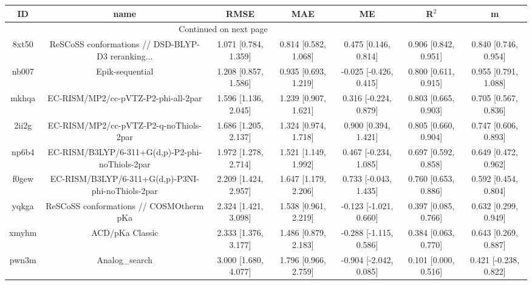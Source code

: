 \documentclass{article}
\begin{document}
\begin{center}
\begin{longtable}{|ccccccc|}
\toprule
    ID &                                               name &                  RMSE &                   MAE &                       ME &                 R$^2$ &                       m \\
\midrule
\endhead
\midrule
\multicolumn{3}{r}{{Continued on next page}} \\
\midrule
\endfoot

\bottomrule
\endlastfoot
 8xt50 &  ReSCoSS conformations // DSD-BLYP-D3 reranking... &  1.071 [0.784, 1.359] &  0.814 [0.582, 1.068] &     0.475 [0.146, 0.814] &  0.906 [0.842, 0.951] &    0.840 [0.746, 0.954] \\
 nb007 &                                    Epik-sequential &  1.208 [0.857, 1.586] &  0.935 [0.693, 1.219] &   -0.025 [-0.426, 0.415] &  0.800 [0.611, 0.915] &    0.955 [0.791, 1.088] \\
 mkhqa &                EC-RISM/MP2/cc-pVTZ-P2-phi-all-2par &  1.596 [1.136, 2.045] &  1.239 [0.907, 1.621] &    0.316 [-0.224, 0.879] &  0.803 [0.665, 0.903] &    0.705 [0.567, 0.836] \\
 2ii2g &             EC-RISM/MP2/cc-pVTZ-P2-q-noThiols-2par &  1.686 [1.205, 2.137] &  1.324 [0.974, 1.718] &     0.900 [0.394, 1.421] &  0.805 [0.660, 0.904] &    0.747 [0.606, 0.893] \\
 np6b4 &    EC-RISM/B3LYP/6-311+G(d,p)-P2-phi-noThiols-2par &  1.972 [1.278, 2.714] &  1.521 [1.149, 1.992] &    0.467 [-0.234, 1.085] &  0.697 [0.592, 0.858] &    0.649 [0.472, 0.962] \\
 f0gew &  EC-RISM/B3LYP/6-311+G(d,p)-P3NI-phi-noThiols-2par &  2.209 [1.424, 2.957] &  1.647 [1.179, 2.206] &    0.733 [-0.043, 1.435] &  0.760 [0.653, 0.886] &    0.592 [0.454, 0.804] \\
 yqkga &            ReSCoSS conformations // COSMOtherm pKa &  2.324 [1.421, 3.098] &  1.538 [0.961, 2.219] &   -0.123 [-1.021, 0.660] &  0.397 [0.085, 0.766] &    0.632 [0.299, 0.949] \\
 xmyhm &                                    ACD/pKa Classic &  2.333 [1.376, 3.177] &  1.486 [0.879, 2.183] &   -0.288 [-1.115, 0.586] &  0.384 [0.063, 0.770] &    0.643 [0.269, 0.887] \\
 pwn3m &                                     Analog\_search &  3.000 [1.680, 4.077] &  1.796 [0.966, 2.759] &   -0.904 [-2.042, 0.085] &  0.101 [0.000, 0.516] &   0.421 [-0.238, 0.822] \\

\end{longtable}
\end{center}
\end{document}
